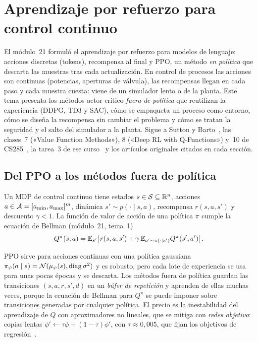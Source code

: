 \chapter{Aprendizaje por refuerzo para control continuo}
\label{tema:4}

El módulo~21 formuló el aprendizaje por refuerzo para modelos de lenguaje: acciones discretas (tokens), recompensa al final y PPO, un método \emph{en política} que descarta las muestras tras cada actualización. En control de procesos las acciones son continuas (potencias, aperturas de válvula), las recompensas llegan en cada paso y cada muestra cuesta: viene de un simulador lento o de la planta. Este tema presenta los métodos actor-crítico \emph{fuera de política} que reutilizan la experiencia (DDPG, TD3 y SAC), cómo se empaqueta un proceso como entorno, cómo se diseña la recompensa sin cambiar el problema y cómo se tratan la seguridad y el salto del simulador a la planta. Sigue a Sutton y Barto~\cite{sb}, las clases~7 («Value Function Methods»), 8 («Deep RL with Q-Functions») y~10 de CS285~\cite{cs285}, la tarea~3 de ese curso~\cite{cs285hw3} y los artículos originales citados en cada sección.

\section{Del PPO a los métodos fuera de política}

\begin{definicion}\label{def:mdp-cont}
Un MDP de control continuo tiene estados $s\in\mathcal{S}\subseteq\mathbb{R}^{n}$, acciones $a\in\mathcal{A}=[a_{\min},a_{\max}]^{m}$, dinámica $s'\sim p(\cdot\mid s,a)$, recompensa $r(s,a,s')$ y descuento $\gamma<1$. La función de valor de acción de una política $\pi$ cumple la ecuación de Bellman (módulo~21, tema~1)
\[
Q^{\pi}(s,a)=\mathbb{E}_{s'}\bigl[r(s,a,s')+\gamma\,\mathbb{E}_{a'\sim\pi(\cdot\mid s')}Q^{\pi}(s',a')\bigr].
\]
\end{definicion}

PPO sirve para acciones continuas con una política gaussiana $\pi_\psi(a\mid s)=\mathcal N(\mu_\psi(s),\operatorname{diag}\sigma^{2})$ y es robusto, pero cada lote de experiencia se usa para unas pocas épocas y se descarta. Los métodos fuera de política guardan las transiciones $(s,a,r,s',d)$ en un \emph{búfer de repetición} y aprenden de ellas muchas veces, porque la ecuación de Bellman para $Q^{\pi}$ se puede imponer sobre transiciones generadas por cualquier política. El precio es la inestabilidad del aprendizaje de $Q$ con aproximadores no lineales, que se mitiga con \emph{redes objetivo}: copias lentas $\phi'\leftarrow\tau\phi+(1-\tau)\phi'$, con $\tau\approx0{,}005$, que fijan los objetivos de regresión~\cite{cs285}.

